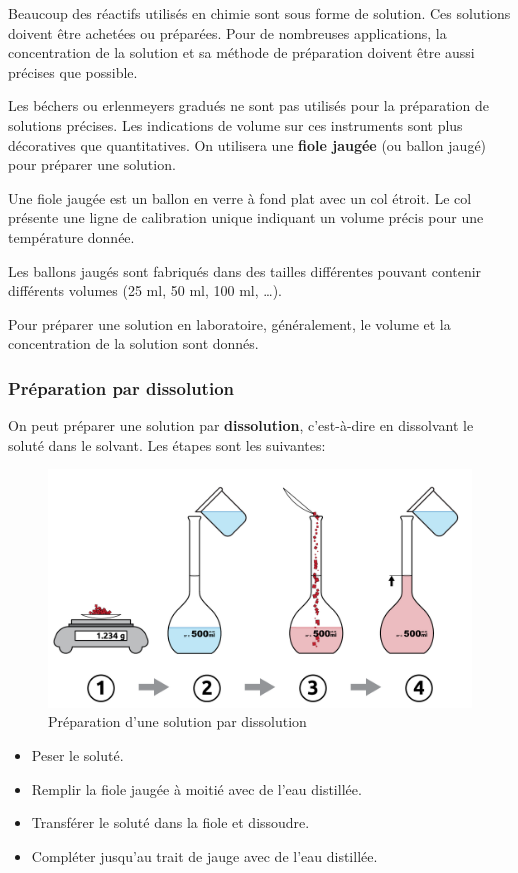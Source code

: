 \documentclass[
  11pt,
  french,
  a4paper,
  openany]{book}
\providecommand{\tightlist}{%
  \setlength{\itemsep}{0pt}\setlength{\parskip}{0pt}}
\begin{document}
Beaucoup des réactifs utilisés en chimie sont sous forme de solution. Ces solutions doivent être achetées ou préparées. Pour de nombreuses applications, la concentration de la solution et sa méthode de préparation doivent être aussi précises que possible.

Les béchers ou erlenmeyers gradués ne sont pas utilisés pour la préparation de solutions précises. Les indications de volume sur ces instruments sont plus décoratives que quantitatives. On utilisera une \textbf{fiole jaugée} (ou ballon jaugé) pour préparer une solution.

Une fiole jaugée est un ballon en verre à fond plat avec un col étroit. Le col présente une ligne de calibration unique indiquant un volume précis pour une température donnée.

Les ballons jaugés sont fabriqués dans des tailles différentes pouvant contenir différents volumes (25 ml, 50 ml, 100 ml, \ldots).

Pour préparer une solution en laboratoire, généralement, le volume et la concentration de la solution sont donnés.

\newpage

\hypertarget{pruxe9paration-par-dissolution}{%
\subsubsection{Préparation par dissolution}\label{pruxe9paration-par-dissolution}}

On peut préparer une solution par \textbf{dissolution}, c'est-à-dire en dissolvant le soluté dans le solvant. Les étapes sont les suivantes:

\begin{figure}

{\centering \includegraphics[width=0.5\linewidth]{images/preparation-1} 

}

\caption{Préparation d'une solution par dissolution}\label{fig:preparation-1}
\end{figure}

\begin{itemize}
\tightlist
\item
  Peser le soluté.
\item
  Remplir la fiole jaugée à moitié avec de l'eau distillée.
\item
  Transférer le soluté dans la fiole et dissoudre.
\item
  Compléter jusqu'au trait de jauge avec de l'eau distillée.
\end{itemize}
\end{document}
